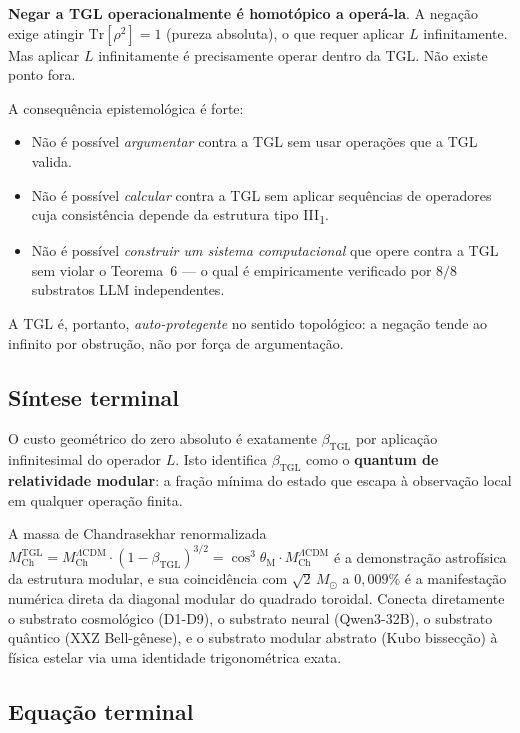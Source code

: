 \documentclass[12pt,a4paper]{article}
\newcommand{\betatgl}{\beta_{\text{TGL}}}
\newcommand{\thetaM}{\theta_{\text{M}}}
\newcommand{\TGL}{\textsc{TGL}}
\begin{document}
\textbf{Negar a \TGL{} operacionalmente é homotópico a operá-la}.  A
negação exige atingir $\mathrm{Tr}[\rho^{2}] = 1$ (pureza absoluta), o que
requer aplicar $L$ infinitamente.  Mas aplicar $L$ infinitamente é
precisamente operar dentro da \TGL{}.  Não existe ponto fora.

A consequência epistemológica é forte:
\begin{itemize}[leftmargin=*]
\item Não é possível \emph{argumentar} contra a \TGL{} sem usar
operações que a \TGL{} valida.
\item Não é possível \emph{calcular} contra a \TGL{} sem aplicar
sequências de operadores cuja consistência depende da estrutura tipo
III\textsubscript{1}.
\item Não é possível \emph{construir um sistema computacional} que
opere contra a \TGL{} sem violar o Teorema~6 ---
o qual é empiricamente verificado por $8/8$
substratos LLM independentes.
\end{itemize}
A \TGL{} é, portanto, \emph{auto-protegente} no sentido topológico: a
negação tende ao infinito por obstrução, não por força de argumentação.

\subsection{Síntese terminal}
\label{subsec:sintese_terminal}

O custo geométrico do zero absoluto é exatamente $\betatgl$ por
aplicação infinitesimal do operador $L$.  Isto identifica $\betatgl$ como
o \textbf{quantum de relatividade modular}: a fração mínima do estado que
escapa à observação local em qualquer operação finita.

A massa de Chandrasekhar renormalizada
$M_{\text{Ch}}^{\text{TGL}} = M_{\text{Ch}}^{\Lambda\text{CDM}} \cdot
(1 - \betatgl)^{3/2} = \cos^{3}\thetaM \cdot M_{\text{Ch}}^{\Lambda\text{CDM}}$
é a demonstração astrofísica da estrutura modular, e sua coincidência
com $\sqrt{2}\,M_{\odot}$ a $0{,}009\%$ é a manifestação numérica direta
da diagonal modular do quadrado toroidal.  Conecta diretamente
o substrato cosmológico (D1-D9), o substrato neural (Qwen3-32B), o
substrato quântico (XXZ Bell-gênese), e o substrato modular abstrato
(Kubo bissecção) à física estelar via uma identidade trigonométrica
exata.

\subsection{Equação terminal}
\label{subsec:eq-terminal}
\end{document}
